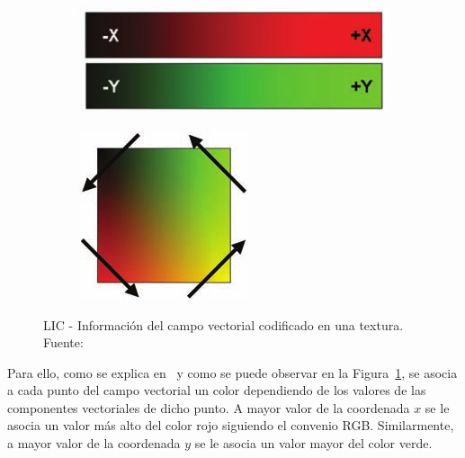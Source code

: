 \begin{figure}[b]
	\centering	
	\begin{subfigure}{0.7\textwidth}
			\includegraphics[width=\textwidth]{figures/lictexture2.png}	
	\end{subfigure}
	\begin{subfigure}{0.28\textwidth}
			\includegraphics[width=\textwidth]{figures/lictexture.png}	
	\end{subfigure}
	\caption[LIC - Información del campo vectorial codificado en una
	textura.]{LIC - Información del campo vectorial codificado en una textura.
	Fuente:~\cite{Bailey}}
	\label{fig:lictexture}
\end{figure}

Para ello, como se explica en~\citet{Bailey} y como se puede observar en la
Figura~\ref{fig:lictexture}, se asocia a cada punto del campo vectorial un color
dependiendo de los valores de las componentes vectoriales de dicho punto. A
mayor valor de la coordenada $x$ se le asocia un valor más alto del color rojo
siguiendo el convenio RGB. Similarmente, a mayor valor de la coordenada $y$ se
le asocia un valor mayor del color verde. 

